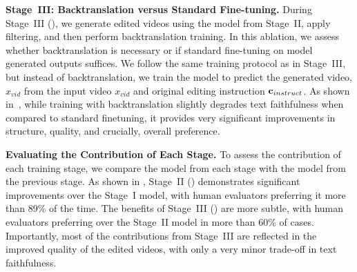 \textbf{Stage~III: Backtranslation versus Standard Fine-tuning.}
During Stage~III (), we generate edited videos using the model from Stage~II, apply filtering, and then perform backtranslation training.
In this ablation, we assess whether backtranslation is necessary or if standard fine-tuning on model generated outputs suffices.
We follow the same training protocol as in Stage~III, but instead of backtranslation, we train the model to predict the generated video, $\hat{x}_{vid}$ from the input video $x_{vid}$ and original editing instruction $\mathbf{c}_{instruct}$.
As shown in~, while training with backtranslation slightly degrades text faithfulness when compared to standard finetuning, it provides very significant improvements in structure, quality, and crucially, overall preference.





\textbf{Evaluating the Contribution of Each Stage.}
To assess the contribution of each training stage, we compare the model from each stage with the model from the previous stage.
As shown in , Stage~II () demonstrates significant improvements over the Stage~I model, with human evaluators preferring it more than 89\% of the time.
The benefits of Stage~III () are more subtle, with human evaluators preferring \OursVideoEdit over the Stage~II model in more than 60\% of cases.
Importantly, most of the contributions from Stage~III are reflected in the improved quality of the edited videos, with only a very minor trade-off in text faithfulness.
